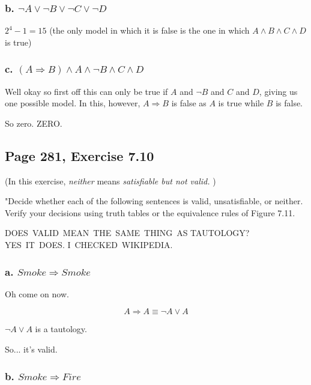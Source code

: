 \documentclass{article}
\begin{document}
\subsubsection{b. $\lnot A\vee \lnot B\vee \lnot C\vee \lnot D$}

$2^{4}-1=\allowbreak 15$ (the only model in which it is false is the one in
which $A\wedge B\wedge C\wedge D$ is true)

\subsubsection{c. $\left( A\Rightarrow B\right) \wedge A\wedge \lnot B\wedge
C\wedge D$}

Well okay so first off this can only be true if $A$ and $\lnot B$ and $C$
and $D$, giving us one possible model. In this, however, $A\Rightarrow B$ is
false as $A$ is true while $B$ is false.

So zero. ZERO.

\subsection{Page 281, Exercise 7.10}

(In this exercise, \textit{neither} means \textit{satisfiable but not valid.}%
)

"Decide whether each of the following sentences is valid, unsatisfiable, or
neither. Verify your decisions using truth tables or the equivalence rules
of Figure 7.11.

DOES\ VALID\ MEAN\ THE\ SAME\ THING\ AS TAUTOLOGY? YES\ IT\ DOES. I\
CHECKED\ WIKIPEDIA.

\subsubsection{a. $Smoke\Rightarrow Smoke$}

Oh come on now.

\begin{equation}
A\Rightarrow A\equiv \lnot A\vee A  \tag{implication elimination}
\end{equation}

$\lnot A\vee A$ is a tautology.

So... it's valid.

\subsubsection{b. $Smoke\Rightarrow Fire$}
\end{document}
